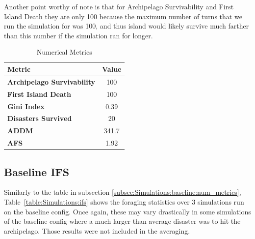 Another point worthy of note is that for Archipelago Survivability and First Island Death they are only 100 because the maximum number of turns that we run the simulation for was 100, and thus island would likely survive much farther than this number if the simulation ran for longer.
\begin{table}[htb]
    \centering
    \begin{tabular}{|l|c|}
    \hline
    \textbf{Metric}                     & \textbf{Value} \\ \hline
    \textbf{Archipelago Survivability}  & 100     \\
    \textbf{First Island Death}         & 100     \\
    \textbf{Gini Index}                 & 0.39    \\
    \textbf{Disasters Survived}         & 20     \\
    \textbf{ADDM}                       & 341.7     \\
    \textbf{AFS}                        & 1.92     \\ \hline
\end{tabular}
\caption{Numerical Metrics}
\label{table:Simulations:num_metric}
\end{table}

\subsection{Baseline IFS}
\label{subsec:Simulations:baseline:ifs}

Similarly to the table in subsection \ref{subsec:Simulations:baseline:num_metrics}, Table~\ref{table:Simulations:ifs} shows the foraging statistics over 3 simulations run on the baseline config. Once again, these may vary drastically in some simulations of the baseline config where a much larger than average disaster was to hit the archipelago. Those results were not included in the averaging.

